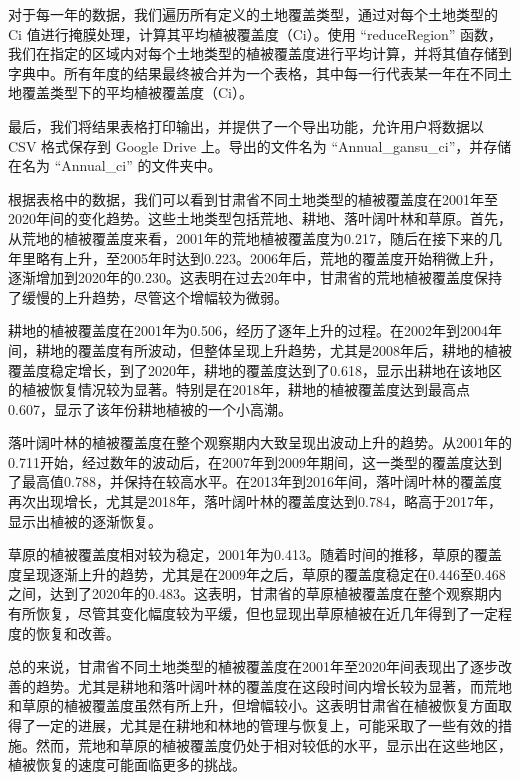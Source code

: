 \documentclass{article}
\begin{document}
		对于每一年的数据，我们遍历所有定义的土地覆盖类型，通过对每个土地类型的 Ci 值进行掩膜处理，计算其平均植被覆盖度（Ci）。使用 ``reduceRegion'' 函数，我们在指定的区域内对每个土地类型的植被覆盖度进行平均计算，并将其值存储到字典中。所有年度的结果最终被合并为一个表格，其中每一行代表某一年在不同土地覆盖类型下的平均植被覆盖度（Ci）。
		
		最后，我们将结果表格打印输出，并提供了一个导出功能，允许用户将数据以 CSV 格式保存到 Google Drive 上。导出的文件名为 ``Annual\_gansu\_ci''，并存储在名为 ``Annual\_ci'' 的文件夹中。

		根据表格中的数据，我们可以看到甘肃省不同土地类型的植被覆盖度在2001年至2020年间的变化趋势。这些土地类型包括荒地、耕地、落叶阔叶林和草原。首先，从荒地的植被覆盖度来看，2001年的荒地植被覆盖度为0.217，随后在接下来的几年里略有上升，至2005年时达到0.223。2006年后，荒地的覆盖度开始稍微上升，逐渐增加到2020年的0.230。这表明在过去20年中，甘肃省的荒地植被覆盖度保持了缓慢的上升趋势，尽管这个增幅较为微弱。
		
		耕地的植被覆盖度在2001年为0.506，经历了逐年上升的过程。在2002年到2004年间，耕地的覆盖度有所波动，但整体呈现上升趋势，尤其是2008年后，耕地的植被覆盖度稳定增长，到了2020年，耕地的覆盖度达到了0.618，显示出耕地在该地区的植被恢复情况较为显著。特别是在2018年，耕地的植被覆盖度达到最高点0.607，显示了该年份耕地植被的一个小高潮。
		
		落叶阔叶林的植被覆盖度在整个观察期内大致呈现出波动上升的趋势。从2001年的0.711开始，经过数年的波动后，在2007年到2009年期间，这一类型的覆盖度达到了最高值0.788，并保持在较高水平。在2013年到2016年间，落叶阔叶林的覆盖度再次出现增长，尤其是2018年，落叶阔叶林的覆盖度达到0.784，略高于2017年，显示出植被的逐渐恢复。
		
		草原的植被覆盖度相对较为稳定，2001年为0.413。随着时间的推移，草原的覆盖度呈现逐渐上升的趋势，尤其是在2009年之后，草原的覆盖度稳定在0.446至0.468之间，达到了2020年的0.483。这表明，甘肃省的草原植被覆盖度在整个观察期内有所恢复，尽管其变化幅度较为平缓，但也显现出草原植被在近几年得到了一定程度的恢复和改善。
		
		总的来说，甘肃省不同土地类型的植被覆盖度在2001年至2020年间表现出了逐步改善的趋势。尤其是耕地和落叶阔叶林的覆盖度在这段时间内增长较为显著，而荒地和草原的植被覆盖度虽然有所上升，但增幅较小。这表明甘肃省在植被恢复方面取得了一定的进展，尤其是在耕地和林地的管理与恢复上，可能采取了一些有效的措施。然而，荒地和草原的植被覆盖度仍处于相对较低的水平，显示出在这些地区，植被恢复的速度可能面临更多的挑战。
		
\end{document}
